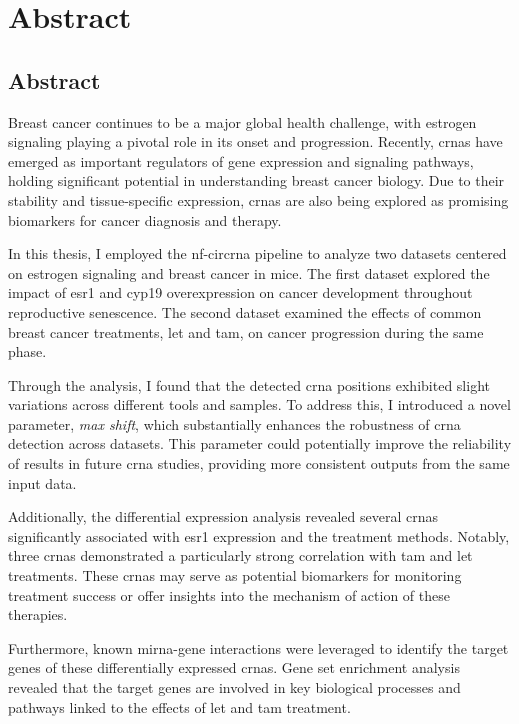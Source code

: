 \chapter{Abstract}

\section{Abstract}
Breast cancer continues to be a major global health challenge, with estrogen
signaling playing a pivotal role in its onset and progression.
Recently, \glspl{crna} have emerged as important regulators of gene expression
and signaling pathways, holding significant potential in understanding breast
cancer biology.
Due to their stability and tissue-specific expression, \glspl{crna} are also
being explored as promising biomarkers for cancer diagnosis and therapy.

In this thesis, I employed the \gls{nf-circrna} pipeline to analyze two
datasets centered on estrogen signaling and breast cancer in mice.
The first dataset explored the impact of \gls{esr1} and \gls{cyp19}
overexpression on cancer development throughout reproductive senescence.
The second dataset examined the effects of common breast cancer treatments,
\gls{let} and \gls{tam}, on cancer progression during the same phase.

Through the analysis, I found that the detected \gls{crna} positions exhibited
slight variations across different tools and samples.
To address this, I introduced a novel parameter, \textit{max shift}, which
substantially enhances the robustness of \gls{crna} detection across datasets.
This parameter could potentially improve the reliability of results in future
\gls{crna} studies, providing more consistent outputs from the same input data.

Additionally, the differential expression analysis revealed several
\glspl{crna} significantly associated with \gls{esr1} expression and the
treatment methods.
Notably, three \glspl{crna} demonstrated a particularly strong correlation with
\gls{tam} and \gls{let} treatments.
These \glspl{crna} may serve as potential biomarkers for monitoring treatment
success or offer insights into the mechanism of action of these therapies.

Furthermore, known \gls{mirna}-gene interactions were leveraged to identify the
target genes of these differentially expressed \glspl{crna}.
Gene set enrichment analysis revealed that the target genes are involved in key
biological processes and pathways linked to the effects of \gls{let} and
\gls{tam} treatment.

